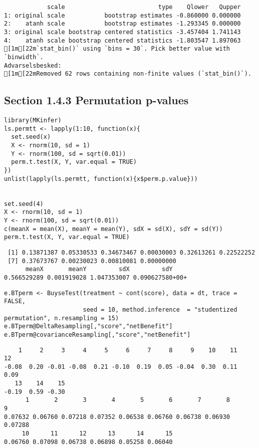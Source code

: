 \documentclass[12pt]{article}
\begin{document}
\begin{verbatim}
            scale                          type    Qlower   Qupper
1: original scale           bootstrap estimates -0.860000 0.000000
2:    atanh scale           bootstrap estimates -1.293345 0.000000
3: original scale bootstrap centered statistics -3.457404 1.741143
4:    atanh scale bootstrap centered statistics -1.803547 1.897063
[1m[22m`stat_bin()` using `bins = 30`. Pick better value with `binwidth`.
Advarselsbesked:
[1m[22mRemoved 62 rows containing non-finite values (`stat_bin()`).
\end{verbatim}


\subsection{Section 1.4.3 Permutation p-values}
\label{sec:orgebe03b2}

\lstset{language=r,label= ,caption= ,captionpos=b,numbers=none}
\begin{lstlisting}
library(MKinfer)
ls.permtt <- lapply(1:10, function(x){
  set.seed(x)
  X <- rnorm(10, sd = 1)
  Y <- rnorm(100, sd = sqrt(0.01))
  perm.t.test(X, Y, var.equal = TRUE)
})
unlist(lapply(ls.permtt, function(x){x$perm.p.value}))


set.seed(4)
X <- rnorm(10, sd = 1)
Y <- rnorm(100, sd = sqrt(0.01))
c(meanX = mean(X), meanY = mean(Y), sdX = sd(X), sdY = sd(Y))
perm.t.test(X, Y, var.equal = TRUE)
\end{lstlisting}

\begin{verbatim}
 [1] 0.13871387 0.05330533 0.34673467 0.00030003 0.32613261 0.22522252
 [7] 0.37673767 0.00230023 0.00810081 0.00000000
      meanX       meanY         sdX         sdY 
0.566529289 0.001919028 1.047353007 0.090627580+00+
\end{verbatim}


\lstset{language=r,label= ,caption= ,captionpos=b,numbers=none}
\begin{lstlisting}
e.BTperm <- BuyseTest(treatment ~ cont(score), data = dt, trace = FALSE,
                      seed = 10, method.inference  = "studentized permutation", n.resampling = 15)
e.BTperm@DeltaResampling[,"score","netBenefit"]
e.BTperm@covarianceResampling[,"score","netBenefit"]
\end{lstlisting}

\begin{verbatim}
    1     2     3     4     5     6     7     8     9    10    11    12 
-0.08  0.20 -0.01 -0.08  0.21 -0.10  0.19  0.05 -0.04  0.30  0.11  0.09 
   13    14    15 
-0.19  0.59 -0.30
      1       2       3       4       5       6       7       8       9 
0.07632 0.06760 0.07218 0.07352 0.06538 0.06760 0.06738 0.06930 0.07288 
     10      11      12      13      14      15 
0.06760 0.07098 0.06738 0.06898 0.05258 0.06040
\end{verbatim}
\end{document}
